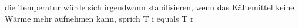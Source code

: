die Temperatur würde sich irgendwann stabilisieren, wenn das Kältemittel keine Wärme mehr aufnehmen kann, sprich T i equals T r